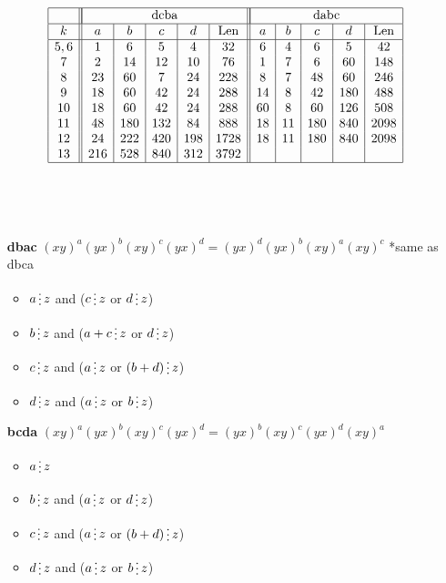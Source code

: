 \documentclass[utf8]{article}
\newcommand{\divisibleby}{\mathop{\raisebox{-2pt}{\vdots}}}
\begin{document}
\begin{itemize}
		\begin{table}[!htb]
			\arraycolsep=2pt
			$$
			\begin{array}{|c||c|c|c|c|c||c|c|c|c|c|}
			\hline
			&\multicolumn{5}{|c||}{\text{dcba}}&\multicolumn{5}{|c|}{\text{dabc}}\\
			\hline
			k&a&b&c&d&\text{Len}&a&b&c&d&\text{Len}\\
			\hline
			5,6&1&6&5&4&32&6&4&6&5&42\\
			7&2&14&12&10&76&1&7&6&60&148\\
			8&23&60&7&24&228&8&7&48&60&246\\
			9&18&60&42&24&288&14&8&42&180&488\\
			10&18&60&42&24&288&60&8&60&126&508\\
			11&48&180&132&84&888&18&11&180&840&2098\\
			12&24&222&420&198&1728&18&11&180&840&2098\\
			13&216&528&840&312&3792&&&&&\\
			\hline
			\end{array}
			$$
		\end{table}
		
		~
		
		~
		
		\item[\textbf{dbac}] $(xy)^a(yx)^b(xy)^c(yx)^d = (yx)^d(yx)^b(xy)^a(xy)^c$  *same as dbca
		\begin{itemize}
			\item $a \divisibleby z$ and ($c \divisibleby z$ or $d \divisibleby z$)
			\item  $b \divisibleby z$ and ($a+c \divisibleby z$ or $d \divisibleby z$)
			\item $c \divisibleby z$ and ($a \divisibleby z$ or $(b+d) \divisibleby z$)
			\item $d \divisibleby z$ and ($a \divisibleby z$ or $b \divisibleby z$)
		\end{itemize}
		
		\item[\textbf{bcda}] $(xy)^a(yx)^b(xy)^c(yx)^d = (yx)^b(xy)^c(yx)^d(xy)^a$ 
		\begin{itemize}
			\item $a \divisibleby z$
			\item  $b \divisibleby z$ and ($a \divisibleby z$ or $d \divisibleby z$)
			\item $c \divisibleby z$ and ($a \divisibleby z$ or $(b+d) \divisibleby z$)
			\item $d \divisibleby z$ and ($a \divisibleby z$ or $b \divisibleby z$)
		\end{itemize}
		

\end{itemize}
\end{document}
